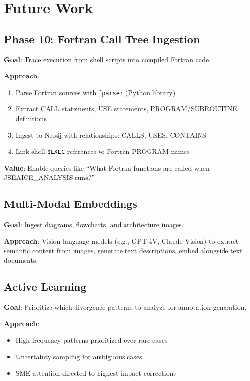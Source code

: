 \documentclass[11pt,letterpaper]{article}
\begin{document}
\section{Future Work}

\subsection{Phase 10: Fortran Call Tree Ingestion}

\textbf{Goal}: Trace execution from shell scripts into compiled Fortran code.

\textbf{Approach}:
\begin{enumerate}
    \item Parse Fortran sources with \texttt{fparser} (Python library)
    \item Extract CALL statements, USE statements, PROGRAM/SUBROUTINE definitions
    \item Ingest to Neo4j with relationships: CALLS, USES, CONTAINS
    \item Link shell \texttt{\$EXEC} references to Fortran PROGRAM names
\end{enumerate}

\textbf{Value}: Enable queries like ``What Fortran functions are called when JSEAICE\_ANALYSIS runs?''

\subsection{Multi-Modal Embeddings}

\textbf{Goal}: Ingest diagrams, flowcharts, and architecture images.

\textbf{Approach}: Vision-language models (e.g., GPT-4V, Claude Vision) to extract semantic content from images, generate text descriptions, embed alongside text documents.

\subsection{Active Learning}

\textbf{Goal}: Prioritize which divergence patterns to analyze for annotation generation.

\textbf{Approach}:
\begin{itemize}
    \item High-frequency patterns prioritized over rare cases
    \item Uncertainty sampling for ambiguous cases
    \item SME attention directed to highest-impact corrections
\end{itemize}
\end{document}
